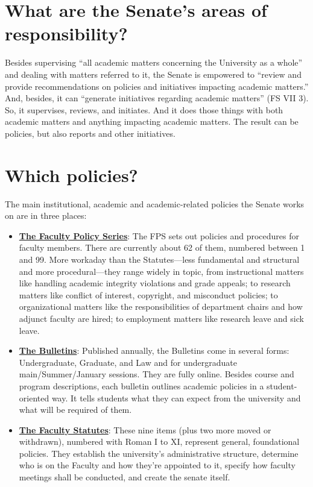 \documentclass[12pt]{article}
\def\tightlist{}
\begin{document}
\section{What are the Senate's areas of
responsibility?}\label{what-are-the-senates-areas-of-responsibility}

Besides supervising ``all academic matters concerning the University as
a whole'' and dealing with matters referred to it, the Senate is
empowered to ``review and provide recommendations on policies and
initiatives impacting academic matters.'' And, besides, it can
``generate initiatives regarding academic matters'' (FS VII 3). So, it
supervises, reviews, and initiates. And it does those things with both
academic matters and anything impacting academic matters. The result can
be policies, but also reports and other initiatives.

\section{Which policies?}\label{which-policies}

The main institutional, academic and academic-related policies the
Senate works on are in three places:

\begin{itemize}
\tightlist
\item
  \textbf{\href{https://www.hofstra.edu/senate/faculty-policy-series.html}{The
  Faculty Policy Series}}: The FPS sets out policies and procedures for
  faculty members. There are currently about 62 of them, numbered
  between 1 and 99. More workaday than the Statutes---less fundamental
  and structural and more procedural---they range widely in topic, from
  instructional matters like handling academic integrity violations and
  grade appeals; to research matters like conflict of interest,
  copyright, and misconduct policies; to organizational matters like the
  responsibilities of department chairs and how adjunct faculty are
  hired; to employment matters like research leave and sick leave.
\item
  \textbf{\href{https://bulletin.hofstra.edu}{The Bulletins}}: Published
  annually, the Bulletins come in several forms: Undergraduate,
  Graduate, and Law and for undergraduate main/Summer/January sessions.
  They are fully online. Besides course and program descriptions, each
  bulletin outlines academic policies in a student-oriented way. It
  tells students what they can expect from the university and what will
  be required of them.
\item
  \textbf{\href{https://www.hofstra.edu/sites/default/files/2024-04/facultystatutes.pdf}{The
  Faculty Statutes}}: These nine items (plus two more moved or
  withdrawn), numbered with Roman I to XI, represent general,
  foundational policies. They establish the university's administrative
  structure, determine who is on the Faculty and how they're appointed
  to it, specify how faculty meetings shall be conducted, and create the
  senate itself.
\end{itemize}
\end{document}
